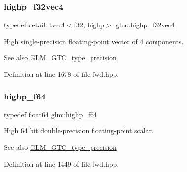 \subsubsection{\texorpdfstring{highp\+\_\+f32vec4}{highp\_f32vec4}}
{\footnotesize\ttfamily typedef \hyperlink{structglm_1_1detail_1_1tvec4}{detail\+::tvec4}$<$\hyperlink{group__gtc__type__precision_ga0ec999b57f5330d9021256e96038df04}{f32}, \hyperlink{namespaceglm_a0f04f086094c747d227af4425893f545ac6f7eab42eacbb10d59a58e95e362074}{highp}$>$ \hyperlink{group__gtc__type__precision_ga53d3c1a17e2e6f26ee5ad1e8879d710e}{glm\+::highp\+\_\+f32vec4}}

High single-\/precision floating-\/point vector of 4 components. \begin{DoxySeeAlso}{See also}
\hyperlink{group__gtc__type__precision}{G\+L\+M\+\_\+\+G\+T\+C\+\_\+type\+\_\+precision} 
\end{DoxySeeAlso}


Definition at line 1678 of file fwd.\+hpp.

\mbox{\label{group__gtc__type__precision_gab1306a5a8ae99fb2867b548b1546bbe0}} 
\subsubsection{\texorpdfstring{highp\+\_\+f64}{highp\_f64}}
{\footnotesize\ttfamily typedef \hyperlink{group__gtc__type__precision_gab721f828b41f46b20cf4883b50733d3b}{float64} \hyperlink{group__gtc__type__precision_gab1306a5a8ae99fb2867b548b1546bbe0}{glm\+::highp\+\_\+f64}}

High 64 bit double-\/precision floating-\/point scalar. \begin{DoxySeeAlso}{See also}
\hyperlink{group__gtc__type__precision}{G\+L\+M\+\_\+\+G\+T\+C\+\_\+type\+\_\+precision} 
\end{DoxySeeAlso}


Definition at line 1449 of file fwd.\+hpp.

\mbox{\label{group__gtc__type__precision_ga7d9fd446fd43310ba6f63c8f9468acc0}} 
